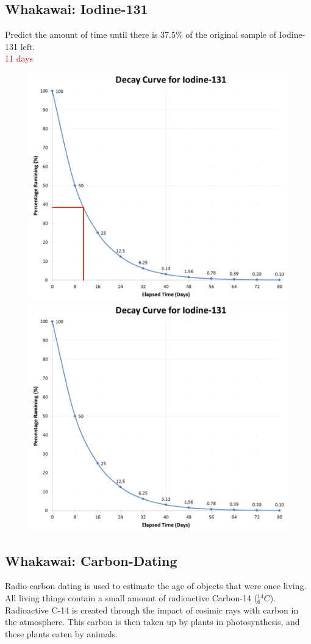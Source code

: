 \documentclass[12pt]{report}
\makeatletter
\DeclareRobustCommand{\StudentVSpace}[2]{%
	\ifthenelse{\boolean{@answer}}
	{\textcolor{red}{\\#1}}
	{\vspace{#2}}
}
\makeatother
\begin{document}
\subsection{Whakawai: Iodine-131}
Predict the amount of time until there is 37.5\% of the original sample of Iodine-131 left.
\StudentVSpace{11 days}{}

\begin{figure}[h]
	\centering
	{\includegraphics[width=0.75\linewidth]{iodine-131-answer.png}}
	{\includegraphics[width=0.75\linewidth]{iodine-131.png}}
\end{figure}

\newpage
\subsection{Whakawai: Carbon-Dating}
Radio-carbon dating is used to estimate the age of objects that were once living. All living things contain a small amount of radioactive Carbon-14 (${}^{14}_{6}C$). Radioactive C-14 is created through the impact of cosimic rays with carbon in the atmosphere. This carbon is then taken up by plants in photosynthesis, and these plants eaten by animals.
\end{document}
